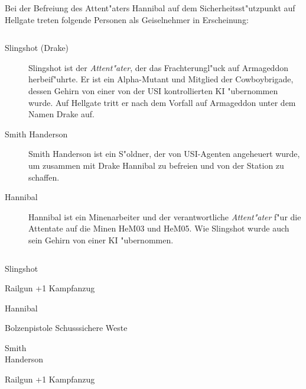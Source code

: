\newpage
{}

Bei der Befreiung des Attent"aters Hannibal auf dem Sicherheitsst"utzpunkt auf Hellgate treten folgende Personen als Geiselnehmer in Erscheinung:

\begin{column}[l]{0.45}
    \begin{description}
        \item[Slingshot (Drake)] Slingshot ist der \emph{Attent"ater}, der das Frachterungl"uck auf Armageddon herbeif"uhrte. Er ist ein 
            Alpha-Mutant und Mitglied der Cowboybrigade, dessen Gehirn von einer von der USI kontrollierten KI "ubernommen wurde. Auf Hellgate tritt er nach dem Vorfall auf Armageddon unter dem Namen Drake auf.
        \item[Smith Handerson] Smith Handerson ist ein S"oldner, der von USI-Agenten angeheuert wurde, um zusammen mit Drake Hannibal zu 
            befreien und von der Station zu schaffen.
        \item[Hannibal] Hannibal ist ein Minenarbeiter und der verantwortliche \emph{Attent"ater} f"ur die Attentate auf die Minen HeM03 und 
            HeM05. Wie Slingshot wurde auch sein Gehirn von einer KI "ubernommen.
    \end{description}
\end{column}
\begin{column}[r]{0.45}
    \begin{nscsheet}[h]{Slingshot}
        \nscstats[ATT=1,AGG=2,DEX=3]
        \nscruler
        \begin{nscinventory}
            \nscitem[Waffen] Railgun +1
            \nscitem[R"ustung] Kampfanzug
        \end{nscinventory}
    \end{nscsheet}    

    \begin{nscsheet}[h]{Hannibal}
        \nscstats[ATT=1,AGG=2,DEX=3,COM=2,CON=2]
        \nscruler
        \begin{nscinventory}
            \nscitem[Waffen] Bolzenpistole
            \nscitem[R"ustung] Schusssichere Weste
        \end{nscinventory}
    \end{nscsheet} 

    \begin{nscsheet}[h]{Smith\\ Handerson}
        \nscstats[ATT=3,AGG=2]
        \nscruler
        \begin{nscinventory}
            \nscitem[Waffen] Railgun +1
            \nscitem[R"ustung] Kampfanzug
        \end{nscinventory}
    \end{nscsheet}
\end{column}

\newpage
